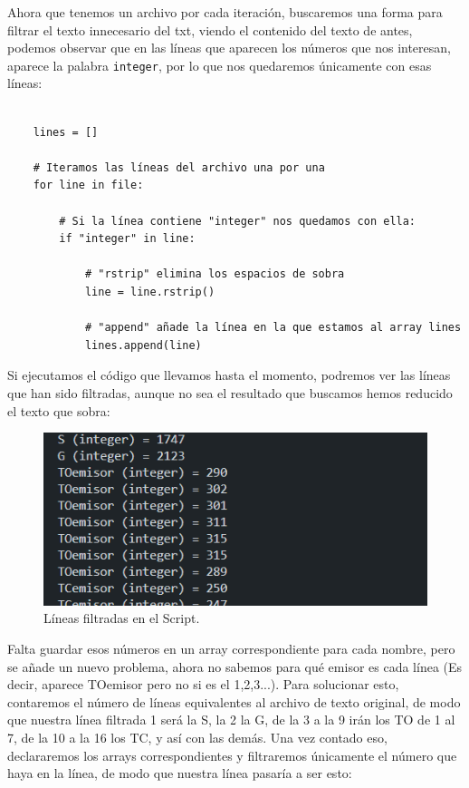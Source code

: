 \documentclass{article}
\begin{document}
Ahora que tenemos un archivo por cada iteración, buscaremos una forma para filtrar el texto innecesario del txt, viendo el contenido del texto de antes, podemos observar que en las líneas que aparecen los números que nos interesan, aparece la palabra \verb|integer|, por lo que nos quedaremos únicamente con esas líneas:

\begin{center} 
    \begin{verbatim}

    lines = []

    # Iteramos las líneas del archivo una por una
    for line in file:

        # Si la línea contiene "integer" nos quedamos con ella:
        if "integer" in line:

            # "rstrip" elimina los espacios de sobra
            line = line.rstrip()

            # "append" añade la línea en la que estamos al array lines
            lines.append(line)

    \end{verbatim}
    \end{center} 

Si ejecutamos el código que llevamos hasta el momento, podremos ver las líneas que han sido filtradas, aunque no sea el resultado que buscamos hemos reducido el texto que sobra:

\quad

\begin{figure}[h]
    \centering
    \includegraphics[width=0.7\linewidth]{src/lineas filtradas1.png}
    \caption{\label{fig:filtradas1} Líneas filtradas en el Script.}
\end{figure}

Falta guardar esos números en un array correspondiente para cada nombre, pero se añade un nuevo problema, ahora no sabemos para qué emisor es cada línea (Es decir, aparece TOemisor pero no si es el 1,2,3...). Para solucionar esto, contaremos el número de líneas equivalentes al archivo de texto original, de modo que nuestra línea filtrada 1 será la S, la 2 la G, de la 3 a la 9 irán los TO de 1 al 7, de la 10 a la 16 los TC, y así con las demás. Una vez contado eso, declararemos los arrays correspondientes y filtraremos únicamente el número que haya en la línea, de modo que nuestra línea pasaría a ser esto:
\end{document}

